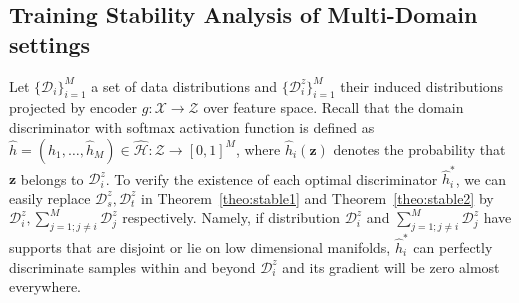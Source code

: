 \documentclass{article} \usepackage{iclr2023_conference,times}
\newcommand{\z}{\mathbf{z}}
\newcommand{\D}{\mathcal{D}}
\begin{document}
\subsection{Training Stability Analysis of Multi-Domain settings}\label{sec:app_stable_md}
Let $\{\D_i\}_{i=1}^M$ a set of data distributions and $\{\D^z_i\}_{i=1}^M$ their induced distributions projected by encoder $g:\mathcal{X}\rightarrow\mathcal{Z}$ over feature space. Recall that the domain discriminator with softmax activation function is defined as $\hat{h}=(\hat{h}_1,\dots,\hat{h}_M)\in\hat{\mathcal{H}}:\mathcal{Z}\rightarrow[0,1]^M$, where $\hat{h}_i(\z)$ denotes the probability that $\z$ belongs to $\D^z_i$. To verify the existence of each optimal discriminator $\hat{h}_i^*$, we can easily replace $\D_s^z,\D_t^z$ in Theorem~\ref{theo:stable1} and Theorem~\ref{theo:stable2} by $\D^z_i,\sum_{j=1;j\neq i}^M\D^z_j$ respectively. Namely, if distribution $\D^z_i$ and $\sum_{j=1;j\neq i}^M\D^z_j$ have supports that are disjoint or lie on low dimensional manifolds, $\hat{h}_i^*$ can perfectly discriminate samples within and beyond $\D^z_i$ and its gradient will be zero almost everywhere.
\end{document}
